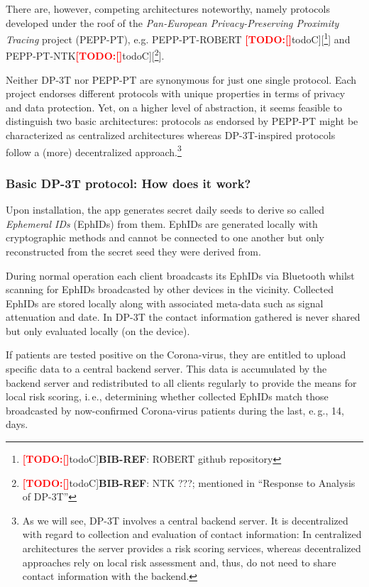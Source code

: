 \documentclass{llncs}
\newcommand{\TODO}[1]{\textcolor{red}{\textbf{[TODO:#1]}}}
\newcommand*{\TODOfn}[2][noteC]{\TODO[#1]{[\footnote{\TODO[#1]{#2}}]}}
\newcommand*{\TODOref}[2][todoC]{\TODOfn[#1]{\textbf{BIB-REF}: #2}}
\begin{document}
There are, however, competing architectures noteworthy, namely protocols developed under the
roof of the \textit{Pan-European Privacy-Preserving Proximity Tracing} project (PEPP-PT), e.g.
PEPP-PT-ROBERT \TODOref{ROBERT github repository} and PEPP-PT-NTK\TODOref{NTK ???; mentioned in
  ``Response to Analysis of DP-3T''}.

Neither DP-3T nor PEPP-PT are synonymous for just one single protocol. Each project endorses
different protocols with unique properties in terms of privacy and data protection.
Yet, on a higher level of abstraction, it seems feasible to distinguish two basic architectures:
protocols as endorsed by PEPP-PT might be characterized as centralized architectures whereas
DP-3T-inspired protocols follow a (more) decentralized approach.\footnote{%
  As we will see, DP-3T involves a central backend server. It is decentralized with regard to
  collection and evaluation of contact information:
  In centralized architectures the server provides a risk scoring services, whereas decentralized
  approaches rely on local risk assessment and, thus, do not need to share contact information with
  the backend.}

\subsubsection{Basic DP-3T protocol: How does it work?}
%
Upon installation, the app generates secret daily seeds to derive so called \textit{Ephemeral IDs}
(EphIDs) from them. EphIDs are generated locally with cryptographic methods and cannot be connected
to one another but only reconstructed from the secret seed they were derived from.

During normal operation each client broadcasts its EphIDs via Bluetooth whilst scanning for
EphIDs broadcasted by other devices in the vicinity. Collected EphIDs are stored locally along
with associated meta-data such as signal attenuation and date. In DP-3T the contact information
gathered is never shared but only evaluated locally (on the device).

If patients are tested positive on the Corona-virus, they are entitled to upload specific data to a
central backend server. This data is accumulated by the backend server and redistributed to all
clients regularly to provide the means for local risk scoring, i.\,e., determining whether collected
EphIDs match those broadcasted by now-confirmed Corona-virus patients during the last, e.\,g., 14, 
days.
\end{document}
